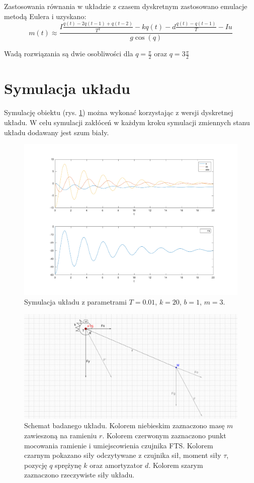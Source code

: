 \documentclass[a4paper, 10pt]{article}
\begin{document}
Zastosowania równania w układzie z czasem dyskretnym zastosowano emulacje metodą Eulera i uzyskano:
\begin{equation}
m(t) \approx \frac{I\frac{q(t)-2q(t-1)+q(t-2)}{T^2}-kq(t)-d\frac{q(t)-q(t-1)}{T}-Iu}{g\cos(q)}
\end{equation}

Wadą rozwiązania są dwie osobliwości dla $q = \frac{\pi}{2}$ oraz $q = 3\frac{\pi}{2}$

\section{Symulacja układu}

Symulację obiektu (rys. \ref{fig:system}) można wykonać korzystając z wersji dyskretnej układu. W celu symulacji zakłóceń w każdym kroku symulacji zmiennych stanu układu dodawany jest szum biały.

\begin{figure}[H]
	\includegraphics[width=0.99\linewidth]{system_sys}
	\centering
	\caption{Symulacja układu z parametrami $T=0.01$, $k = 20$, $b = 1$, $m = 3$.}
	\label{fig:system}
\end{figure}


\begin{figure}[H]
	\includegraphics[width=0.99\linewidth]{2d}
	\centering
	\caption{Schemat badanego układu. Kolorem niebieskim zaznaczono masę $m$ zawieszoną na ramieniu $r$. Kolorem czerwonym zaznaczono punkt mocowania ramienie i umiejscowienia czujnika FTS. Kolorem czarnym pokazano siły odczytywane z czujnika sił, moment siły $\tau$, pozycję $q$ sprężynę $k$ oraz amortyzator $d$. Kolorem szarym zaznaczono rzeczywiste siły układu.}
	\label{fig:2d}
\end{figure}
\end{document}
